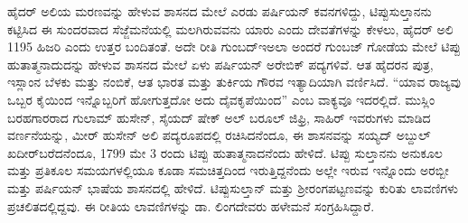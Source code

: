 ಹೈದರ್​ ಅಲಿಯ ಮರಣವನ್ನು ಹೇಳುವ ಶಾಸನದ ಮೇಲೆ ಎರಡು ಪರ್ಷಿಯನ್​ ಕವನಗಳಿದ್ದು, ಟಿಪ್ಪುಸುಲ್ತಾನನು ಕಟ್ಟಿಸಿದ ಈ ಸುಂದರವಾದ ಸೆಜ್ಜೆಮನೆಯಲ್ಲಿ ಮಲಗಿರುವವನು ಯಾರು ಎಂದು ದೇವತೆಗಳನ್ನು ಕೇಳಲು, ಹೈದರ್​ ಅಲಿ 1195 ಹಿಜರಿ ಎಂದು ಉತ್ತರ ಬಂದಿತಂತೆ. ಅದೇ ರೀತಿ ಗುಂಬದ್​ಇ​ಅಲಾ ಅಂದರೆ ಗುಂಬಜ್​ ಗೋಡೆಯ ಮೇಲೆ ಟಿಪ್ಪು ಹುತಾತ್ಮನಾದುದನ್ನು ಹೇಳುವ ಶಾಸನದ ಮೇಲೆ ಏಳು ಪರ್ಷಿಯನ್​ ಅರೇಬಿಕ್​ ಪದ್ಯಗಳಿವೆ. ಆತ ಹೈದರನ ಪುತ್ರ, ಇಸ್ಲಾಂನ ಬೆಳಕು ಮತ್ತು ನಂಬಿಕೆ, ಆತ ಭಾರತ ಮತ್ತು ತುರ್ಕಿಯ ಗೌರವ ಇತ್ಯಾದಿಯಾಗಿ ವರ್ಣಿಸಿದೆ. “ಯಾವ ರಾಜ್ಯವು ಒಬ್ಬರ ಕೈಯಿಂದ ಇನ್ನೊಬ್ಬರಿಗೆ ಹೋಗುತ್ತದೋ ಅದು ದೈವಕೃಪೆಯಿಂದ” ಎಂಬ ವಾಕ್ಯವೂ ಇದರಲ್ಲಿದೆ. ಮುಸ್ಲಿಂ ಬರಹಗಾರರಾದ ಗುಲಾಮ್ ಹುಸೇನ್​, ಸೈಯದ್​ ಷೇಕ್​ ಅಲ್​ ಬರೂಲ್​ ಜಿಫ್ರಿ, ಸಾಹಿರ್​ ಇವರುಗಳು ಮಾಡಿದ ವರ್ಣನೆಯನ್ನು, ಮೀರ್​ ಹುಸೇನ್​ ಅಲಿ ಪದ್ಯರೂಪದಲ್ಲಿ ರಚಿಸಿದನೆಂದೂ, ಈ ಶಾಸನವನ್ನು ಸಯ್ಯದ್​ ಅಬ್ದುಲ್​ ಖದೀರ್​ ಬರೆದನೆಂದೂ, 1799 ಮೇ 3 ರಂದು ಟಿಪ್ಪು ಹುತಾತ್ಮನಾದನೆಂದು ಹೇಳಿದೆ. ಟಿಪ್ಪು ಸುಲ್ತಾನನು ಅನುಕೂಲ ಮತ್ತು ಪ್ರತಿಕೂಲ ಸಮಯಗಳಲ್ಲಿಯೂ ಕೂಡಾ ಸಮಚಿತ್ತದಿಂದ ಇರುತ್ತಿದ್ದನೆಂದು ಅಲ್ಲೇ ಇರುವ ಇನ್ನೊಂದು ಅರಬ್ಬೀ ಮತ್ತು ಪರ್ಷಿಯನ್​ ಭಾಷೆಯ ಶಾಸನದಲ್ಲಿ ಹೇಳಿದೆ. ಟಿಪ್ಪುಸುಲ್ತಾನ್​ ಮತ್ತು ಶ‍್ರೀರಂಗಪಟ್ಟಣವನ್ನು ಕುರಿತು ಲಾವಣಿಗಳು ಪ್ರಚಲಿತದಲ್ಲಿದ್ದವು. ಈ ರೀತಿಯ ಲಾವಣಿಗಳನ್ನು ಡಾ. ಲಿಂಗದೇವರು ಹಳೇಮನೆ ಸಂಗ್ರಹಿಸಿದ್ದಾರೆ.

\theendnotes

